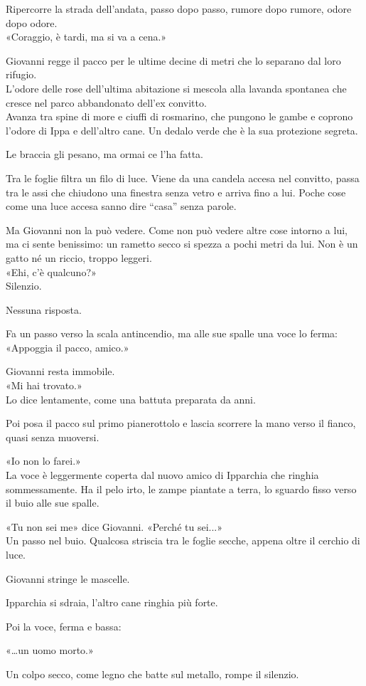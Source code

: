 Ripercorre la strada dell’andata, passo dopo passo, rumore dopo rumore, odore dopo odore.\\
«Coraggio, \`e tardi, ma si va a cena.»

Giovanni regge il pacco per le ultime decine di metri che lo separano dal loro rifugio.\\
L’odore delle rose dell’ultima abitazione si mescola alla lavanda spontanea che cresce nel parco abbandonato dell’ex convitto.\\
Avanza tra spine di more e ciuffi di rosmarino, che pungono le gambe e coprono l’odore di Ippa e dell’altro cane. Un dedalo verde che \`e la sua protezione segreta.

Le braccia gli pesano, ma ormai ce l’ha fatta.

Tra le foglie filtra un filo di luce. Viene da una candela accesa nel convitto, passa tra le assi che chiudono una finestra senza vetro e arriva fino a lui. Poche cose come una luce accesa sanno dire “casa” senza parole.

Ma Giovanni non la pu\`o vedere. Come non pu\`o vedere altre cose intorno a lui, ma ci sente benissimo: un rametto secco si spezza a pochi metri da lui. Non \`e un gatto n\'e un riccio, troppo leggeri.\\
«Ehi, c’\`e qualcuno?»\\
Silenzio.

Nessuna risposta.

Fa un passo verso la scala antincendio, ma alle sue spalle una voce lo ferma:\\
«Appoggia il pacco, amico.»

Giovanni resta immobile.\\
«Mi hai trovato.»\\
Lo dice lentamente, come una battuta preparata da anni.

Poi posa il pacco sul primo pianerottolo e lascia scorrere la mano verso il fianco, quasi senza muoversi.

«Io non lo farei.»\\

La voce \`e leggermente coperta   dal nuovo amico di Ipparchia che ringhia sommessamente. Ha il pelo irto, le zampe piantate a terra, lo sguardo fisso verso il buio alle sue spalle.

«Tu non sei me» dice Giovanni. «Perché tu sei...»\\

Un passo nel buio. Qualcosa striscia tra le foglie secche, appena oltre il cerchio di luce.

Giovanni stringe le mascelle.

Ipparchia si sdraia, l’altro cane ringhia pi\`u forte.

Poi la voce, ferma e bassa:

«…un uomo morto.»

Un colpo secco, come legno che batte sul metallo, rompe il silenzio.

